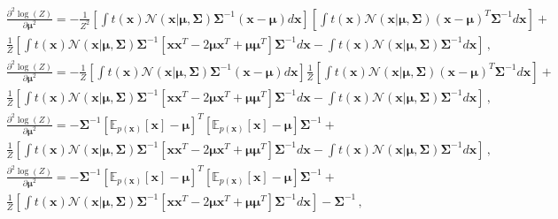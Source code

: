 \begin{align}
& \frac{\partial^2 \log (Z)}{\partial \boldsymbol{\mu}^2} = - \frac{1}{Z^2}  [ \int t(\mathbf{x}) \mathcal{N}(\mathbf{x}|\boldsymbol{\mu},\boldsymbol{\Sigma})  \boldsymbol{\Sigma}^{-1} (\mathbf{x} - \boldsymbol{\mu})  d\mathbf{x}]   [\int t(\mathbf{x}) \mathcal{N}(\mathbf{x}|\boldsymbol{\mu},\boldsymbol{\Sigma})  (\mathbf{x} - \boldsymbol{\mu})^T  \boldsymbol{\Sigma}^{-1}  d\mathbf{x}] + \nonumber \\
& \frac{1}{Z}  [ \int t(\mathbf{x}) \mathcal{N}(\mathbf{x}|\boldsymbol{\mu},\boldsymbol{\Sigma})  \boldsymbol{\Sigma}^{-1} [ \mathbf{x} \mathbf{x}^T - 2 \boldsymbol{\mu} \mathbf{x}^T  + \boldsymbol{\mu} \boldsymbol{\mu}^T ]  \boldsymbol{\Sigma}^{-1}  d \mathbf{x} - \int t(\mathbf{x}) \mathcal{N}(\mathbf{x}|\boldsymbol{\mu},\boldsymbol{\Sigma})  \boldsymbol{\Sigma}^{-1} d \mathbf{x} ] \nonumber \,, \\
& \frac{\partial^2 \log (Z)}{\partial \boldsymbol{\mu}^2} = - \frac{1}{Z}  [ \int t(\mathbf{x}) \mathcal{N}(\mathbf{x}|\boldsymbol{\mu},\boldsymbol{\Sigma})  \boldsymbol{\Sigma}^{-1} (\mathbf{x} - \boldsymbol{\mu})  d\mathbf{x}]  \frac{1}{Z}  [\int t(\mathbf{x}) \mathcal{N}(\mathbf{x}|\boldsymbol{\mu},\boldsymbol{\Sigma})  (\mathbf{x} - \boldsymbol{\mu})^T  \boldsymbol{\Sigma}^{-1}  d\mathbf{x}] + \nonumber \\
& \frac{1}{Z}  [ \int t(\mathbf{x}) \mathcal{N}(\mathbf{x}|\boldsymbol{\mu},\boldsymbol{\Sigma})  \boldsymbol{\Sigma}^{-1} [ \mathbf{x} \mathbf{x}^T - 2 \boldsymbol{\mu} \mathbf{x}^T  + \boldsymbol{\mu} \boldsymbol{\mu}^T ]  \boldsymbol{\Sigma}^{-1}  d \mathbf{x} - \int t(\mathbf{x}) \mathcal{N}(\mathbf{x}|\boldsymbol{\mu},\boldsymbol{\Sigma})  \boldsymbol{\Sigma}^{-1} d\mathbf{x} ] \nonumber \,, \\
& \frac{\partial^2 \log (Z)}{\partial \boldsymbol{\mu}^2} = - \boldsymbol{\Sigma}^{-1} [ \mathds{E}_{p(\mathbf{x})}[\mathbf{x}] - \boldsymbol{\mu}  ]^T  [ \mathds{E}_{p(\mathbf{x})}[\mathbf{x}] - \boldsymbol{\mu}  ] \boldsymbol{\Sigma}^{-1} + \nonumber \\ 
& \frac{1}{Z}  [ \int t(\mathbf{x}) \mathcal{N}(\mathbf{x}|\boldsymbol{\mu},\boldsymbol{\Sigma})  \boldsymbol{\Sigma}^{-1} [ \mathbf{x} \mathbf{x}^T - 2 \boldsymbol{\mu} \mathbf{x}^T  + \boldsymbol{\mu} \boldsymbol{\mu}^T ]  \boldsymbol{\Sigma}^{-1}  d \mathbf{x} - \int t(\mathbf{x}) \mathcal{N}(\mathbf{x}|\boldsymbol{\mu},\boldsymbol{\Sigma})  \boldsymbol{\Sigma}^{-1} d \mathbf{x} ] \nonumber \,, \\
& \frac{\partial^2 \log (Z)}{\partial \boldsymbol{\mu}^2} = - \boldsymbol{\Sigma}^{-1} [ \mathds{E}_{p(\mathbf{x})}[\mathbf{x}] - \boldsymbol{\mu}  ]^T  [ \mathds{E}_{p(\mathbf{x})}[\mathbf{x}] - \boldsymbol{\mu}  ] \boldsymbol{\Sigma}^{-1} + \nonumber \\
& \frac{1}{Z}  [ \int t(\mathbf{x}) \mathcal{N}(\mathbf{x}|\boldsymbol{\mu},\boldsymbol{\Sigma})  \boldsymbol{\Sigma}^{-1} [ \mathbf{x} \mathbf{x}^T - 2 \boldsymbol{\mu} \mathbf{x}^T  + \boldsymbol{\mu} \boldsymbol{\mu}^T ]  \boldsymbol{\Sigma}^{-1}  d \mathbf{x}]  - \boldsymbol{\Sigma}^{-1} \nonumber \,, \\
\end{align}
